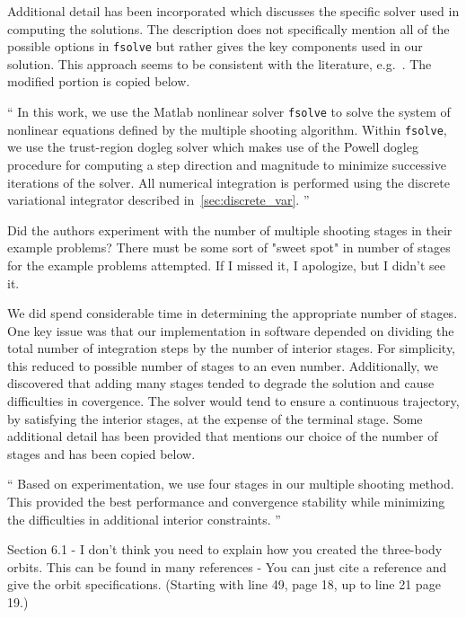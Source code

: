\documentclass[11pt]{article}
\newenvironment{correction}{\begin{list}{}{\setlength{\leftmargin}{1cm}\setlength{\rightmargin}{1cm}}\vspace{\parsep}\item[]``}{''\end{list}}
\begin{document}
\begin{enumerate}
Additional detail has been incorporated which discusses the specific solver used in computing the solutions. 
The description does not specifically mention all of the possible options in \texttt{fsolve} but rather gives the key components used in our solution.
This approach seems to be consistent with the literature, e.g.~\cite{ozimek2010a,stuart2010}.
The modified portion is copied below.

\begin{correction}
In this work, we use the Matlab nonlinear solver \texttt{fsolve} to solve the system of nonlinear equations defined by the multiple shooting algorithm.
Within \texttt{fsolve}, we use the trust-region dogleg solver which makes use of the Powell dogleg procedure for computing a step direction and magnitude to minimize successive iterations of the solver.
All numerical integration is performed using the discrete variational integrator described in~\cref{sec:discrete_var}.
\end{correction}

\item
    \begin{itshape}
Did the authors experiment with the number of multiple shooting stages in their example problems?  There must be some sort of "sweet spot" in number of stages for the example problems attempted.  If I missed it, I apologize, but I didn't see it.
\end{itshape}

We did spend considerable time in determining the appropriate number of stages. 
One key issue was that our implementation in software depended on dividing the total number of integration steps by the number of interior stages.
For simplicity, this reduced to possible number of stages to an even number. 
Additionally, we discovered that adding many stages tended to degrade the solution and cause difficulties in covergence. 
The solver would tend to ensure a continuous trajectory, by satisfying the interior stages, at the expense of the terminal stage. 
Some additional detail has been provided that mentions our choice of the number of stages and has been copied below.

\begin{correction}
Based on experimentation, we use four stages in our multiple shooting method.
This provided the best performance and convergence stability while minimizing the difficulties in additional interior constraints.
\end{correction}


\item 
    \begin{itshape}
Section 6.1 - I don't think you need to explain how you created the three-body orbits.  This can be found in many references - You can just cite a reference and give the orbit specifications.  (Starting with line 49, page 18, up to line 21 page 19.)
\end{itshape}


\end{enumerate}
\end{document}
